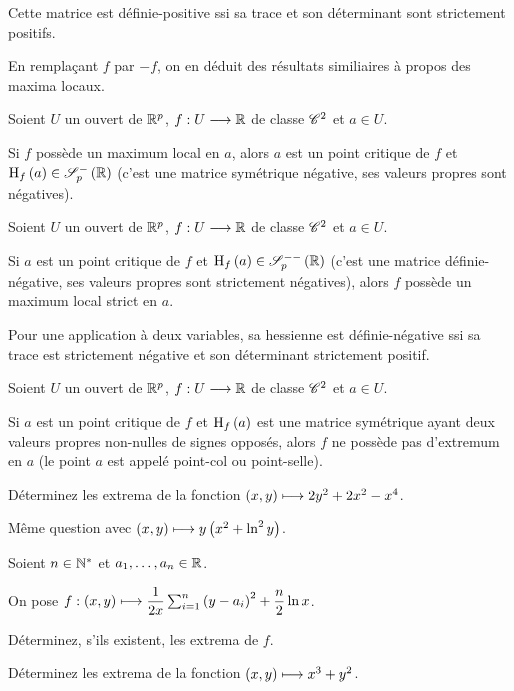 Cette matrice est définie-positive ssi sa trace et son déterminant sont strictement positifs.

En remplaçant \(f\) par \(-f\), on en déduit des résultats similiaires à propos des maxima locaux.

\begin{prop}
Soient \(U\) un ouvert de \(\mathbb{R}^p\), \(f:U\longrightarrow\mathbb{R}\) de classe \(\mathscr{C}^{2}\) et \(a\in U\).

Si \(f\) possède un maximum local en \(a\), alors \(a\) est un point critique de \(f\) et \(\hessienne{f}\paren{a}\in\symneg{p}[\R]\) (\ie c'est une matrice symétrique négative, ses valeurs propres sont négatives).
\end{prop}

\begin{prop}
Soient \(U\) un ouvert de \(\mathbb{R}^p\), \(f:U\longrightarrow\mathbb{R}\) de classe \(\mathscr{C}^{2}\) et \(a\in U\).

Si \(a\) est un point critique de \(f\) et \(\hessienne{f}\paren{a}\in\symdefneg{p}[\R]\) (\ie c'est une matrice définie-négative, ses valeurs propres sont strictement négatives), alors \(f\) possède un maximum local strict en \(a\).
\end{prop}

Pour une application à deux variables, sa hessienne est définie-négative ssi sa trace est strictement négative et son déterminant strictement positif.

\begin{prop}
Soient \(U\) un ouvert de \(\mathbb{R}^p\), \(f:U\longrightarrow\mathbb{R}\) de classe \(\mathscr{C}^{2}\) et \(a\in U\).

Si \(a\) est un point critique de \(f\) et \(\operatorname{H}_{f}\left(a\right)\) est une matrice symétrique ayant deux valeurs propres non-nulles de signes opposés, alors \(f\) ne possède pas d'extremum en \(a\) (le point \(a\) est appelé point-col ou point-selle).
\end{prop}

\begin{exo}
Déterminez les extrema de la fonction \(\left(x,y\right)\longmapsto2y^2+2x^2-x^4\).
\end{exo}

\begin{exo}
Même question avec \(\left(x,y\right)\longmapsto y\left(x^2+\ln^2y\right)\).
\end{exo}

\begin{exo}
Soient \(n\in\mathbb{N}^*\) et \(a_1,\dots,a_n\in\mathbb{R}\).

On pose \(f:\left(x,y\right)\longmapsto\dfrac{1}{2x}\sum_{i=1}^n\left(y-a_i\right)^2+\dfrac{n}{2}\ln x\).

Déterminez, s'ils existent, les extrema de \(f\).
\end{exo}

\begin{exo}
Déterminez les extrema de la fonction \(\left(x,y\right)\longmapsto x^3+y^2\).
\end{exo}
